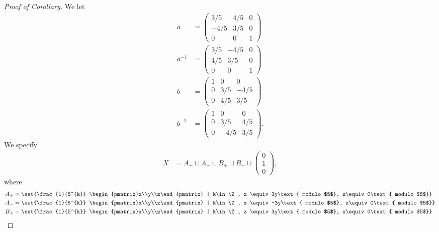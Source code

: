 \documentclass[10pt]{mypackage}
\begin{document}
\begin{proof}[Proof of Corollary]
  We let
  \begin{align*}
    a &= \begin{pmatrix}3/5 & 4/5 & 0 \\ -4/5 & 3/5 & 0 \\ 0 & 0 & 1\end{pmatrix}\\
    a^{-1} &= \begin{pmatrix}3/5 & -4/5 & 0 \\ 4/5 & 3/5 & 0 \\ 0 & 0 & 1\end{pmatrix}\\
    b &= \begin{pmatrix}1 & 0 & 0 \\ 0 & 3/5 & -4/5 \\ 0 & 4/5 & 3/5\end{pmatrix}\\
    b^{-1} &= \begin{pmatrix}1 & 0 & 0 \\ 0 & 3/5 & 4/5 \\ 0 & -4/5 & 3/5\end{pmatrix}.
  \end{align*}
  We specify
  \begin{align*}
    X &= A_{+} \sqcup A_{-} \sqcup B_{+} \sqcup B_{-} \sqcup \begin{pmatrix}0\\1\\0\end{pmatrix},
  \end{align*}
  where
  \begin{align*}
    A_{+} &= \set{\frac{1}{5^{k}} \begin{pmatrix}x\\y\\z\end{pmatrix} | k\in \Z, x \equiv 3y\text{ modulo $5$}, z\equiv0\text{ modulo $5$}}\\
    A_{-} &= \set{\frac{1}{5^{k}} \begin{pmatrix}x\\y\\z\end{pmatrix} | k\in \Z, x \equiv -3y\text{ modulo $5$}, z\equiv 0\text{ modulo $5$}}\\
    B_{+} &= \set{\frac{1}{5^{k}} \begin{pmatrix}x\\y\\z\end{pmatrix} | k\in \Z, z \equiv 3y\text{ modulo $5$}, x\equiv 0\text{ modulo $5$}}\\

\end{align*}
\end{proof}
\end{document}
